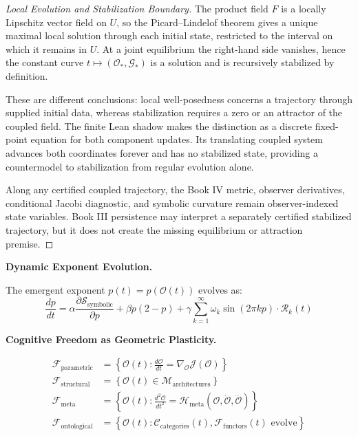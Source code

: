 \begin{scholium}
\begin{proof}[Local Evolution and Stabilization Boundary]
\label{proof:bk4_observer_geometry_coevolution}
The product field $F$ is a locally Lipschitz vector field on $U$, so the
Picard--Lindelof theorem gives a unique maximal local solution through each
initial state, restricted to the interval on which it remains in $U$.  At a
joint equilibrium the right-hand side vanishes, hence the constant curve
$t\mapsto(\mathcal O_*,\mathcal G_*)$ is a solution and is recursively
stabilized by definition.

These are different conclusions: local well-posedness concerns a trajectory
through supplied initial data, whereas stabilization requires a zero or an
attractor of the coupled field.  The finite Lean shadow makes the distinction
as a discrete fixed-point equation for both component updates.  Its translating
coupled system advances both coordinates forever and has no stabilized state,
providing a countermodel to stabilization from regular evolution alone.

Along any certified coupled trajectory, the Book IV metric, observer
derivatives, conditional Jacobi diagnostic, and symbolic curvature remain
observer-indexed state variables.  Book III persistence may interpret a
separately certified stabilized trajectory, but it does not create the missing
equilibrium or attraction premise.
\end{proof}

\vspace{1em}
\noindent\textbf{Dynamic Exponent Evolution.}

The emergent exponent $p(t) = p(\mathcal{O}(t))$ evolves as:
\[
\frac{dp}{dt} = \alpha \frac{\partial \mathcal{S}_{\text{symbolic}}}{\partial p} + \beta p(2-p) + \gamma \sum_{k=1}^{\infty} \omega_k \sin(2\pi k p) \cdot \mathcal{R}_k(t)
\]

\vspace{1em}
\noindent\textbf{Cognitive Freedom as Geometric Plasticity.}

\begin{align*}
\mathcal{F}_{\text{parametric}} &= \left\{ \mathcal{O}(t) : \frac{d\mathcal{O}}{dt} = \nabla_{\mathcal{O}} \mathcal{J}(\mathcal{O}) \right\} \\
\mathcal{F}_{\text{structural}} &= \left\{ \mathcal{O}(t) \in \mathcal{M}_{\text{architectures}} \right\} \\
\mathcal{F}_{\text{meta}} &= \left\{ \mathcal{O}(t) : \frac{d^2\mathcal{O}}{dt^2} = \mathcal{H}_{\text{meta}}(\mathcal{O}, \dot{\mathcal{O}}, \ddot{\mathcal{O}}) \right\} \\
\mathcal{F}_{\text{ontological}} &= \left\{ \mathcal{O}(t) : \mathcal{C}_{\text{categories}}(t), \mathcal{F}_{\text{functors}}(t) \text{ evolve} \right\}
\end{align*}


\end{scholium}
